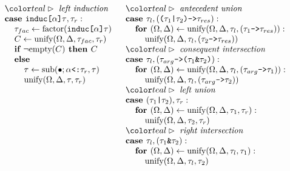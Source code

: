 \documentclass[acmsmall]{acmart}
\begin{document}
\begin{figure*}[h]
\[\begin{array}[t]{@{} l}
    \I \C{left induction}
    \\
    \I \B{case } \code{induc[$\alpha$]$\tau$}, \tau_r :
    \\
    \I\I \tau_{fac} \leftarrow \F{factor}(\code{induc[$\alpha$]$\tau$})
    \\
    \I\I C \leftarrow \F{unify}(\Omega, \Delta, \tau_{fac}, \tau_r)
    \\
    \I\I \B{if } \neg \F{empty}(C) \B{ then } C
    \\
    \I\I \B{else }
    \\
    \I\I\I \tau \leftarrow \F{sub}(\bullet;\code{$\alpha$<:$\tau_r$}, \tau) 
    \\
    \I\I\I \F{unify}(\Omega, \Delta, \tau, \tau_r)
\end{array}
\begin{array}[t]{@{} l}

    \I \C{antecedent union}
    \\
    \I \B{case } \tau_l, (\code{($\tau_1$|$\tau_2$)->$\tau_{res}$}) : 
    \\
    \I\I \B{for } (\Omega, \Delta) \leftarrow \F{unify}(\Omega, \Delta, \tau_l, (\code{$\tau_1$->$\tau_{res}$})):
    \\
    \I\I\I \F{unify}(\Omega, \Delta, \tau_l, (\code{$\tau_2$->$\tau_{res}$})) 

    \\

    \I \C{consequent intersection}
    \\
    \I \B{case } \tau_l, (\code{$\tau_{arg}$->($\tau_1$\&$\tau_2$)}) : 
    \\
    \I\I \B{for } (\Omega, \Delta) \leftarrow \F{unify}(\Omega, \Delta, \tau_l, (\code{$\tau_{arg}$->$\tau_1$})):
    \\
    \I\I\I \F{unify}(\Omega, \Delta, \tau_l, (\code{$\tau_{arg}$->$\tau_2$}))

    \\

    \I \C{left union}
    \\
    \I \B{case } (\code{$\tau_1$|$\tau_2$}), \tau_r : 
    \\
    \I\I \B{for } (\Omega, \Delta) \leftarrow \F{unify}(\Omega, \Delta, \tau_1, \tau_r):
    \\
    \I\I\I \F{unify}(\Omega, \Delta, \tau_2, \tau_r) 

    \\

    \I \C{right intersection}
    \\
    \I \B{case } \tau_l, (\code{$\tau_1$\&$\tau_2$}) : 
    \\
    \I\I \B{for } (\Omega, \Delta) \leftarrow \F{unify}(\Omega, \Delta, \tau_l, \tau_1):
    \\
    \I\I\I \F{unify}(\Omega, \Delta, \tau_l, \tau_2) 


\end{array}\]
\end{figure*}
\end{document}
